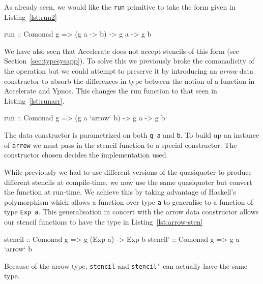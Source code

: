 \documentclass[12pt,a4paper,twoside]{scrbook}
\begin{document}
As already seen, we would like the \texttt{run} primitive to take the
form given in Listing~\ref{lst:run2}

\begin{hflisting}[label={lst:run2}, caption=The comonadic run type. Changing the
  type of \texttt{g} could change the backend used.]
run :: Comonad g => (g a -> b) -> g a -> g b
\end{hflisting}

We have also seen that Accelerate does not accept stencils of this form (see
Section~\ref{sec:typesysapp}).  To solve this we previously broke the
comonadicity of the operation but we could attempt to preserve it by introducing
an \emph{arrow} data constructor to absorb the differences in type between the
notion of a function in Accelerate and Ypnos. This changes the run function to
that seen in Listing~\ref{lst:runarr}.

\begin{hflisting}[label={lst:runarr}, caption=The type run is generalised to
  using the \texttt{arrow} type.]
run :: Comonad g => (g a `arrow` b) -> g a -> g b
\end{hflisting}

The data constructor is parametrized on both \texttt{g a} and
\texttt{b}. To build up an instance of \texttt{arrow} we must pass in the
stencil function to a special constructor. The constructor chosen
decides the implementation used.

While previously we had to use different versions of the quasiquoter to
produce different stencils at compile-time, we now use the same
quasiquoter but convert the function at run-time. We achieve this by
taking advantage of Haskell's polymorphism which allows a function over
type \texttt{a} to generalise to a function of type \texttt{Exp a}. This
generalisation in concert with the arrow data constructor allows our
stencil functions to have the type in Listing~\ref{lst:arrow-sten}

\begin{hflisting}[label={lst:arrow-sten}, caption=Here we see the type the
  stencil must have in Accelerate (\texttt{stencil}) and the type we can
  generalise to using the \texttt{arrow} type (\texttt{stencil'}).]
stencil :: Comonad g => g (Exp a) -> Exp b
stencil' :: Comonad g => g a `arrow` b
\end{hflisting}

Because of the arrow type, \texttt{stencil} and \texttt{stencil'} can
actually have the same type.
\end{document}
